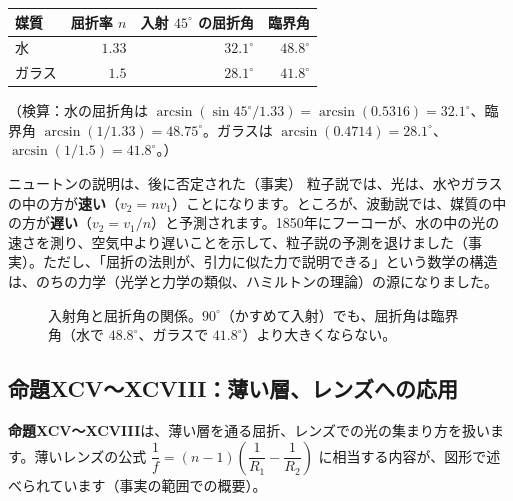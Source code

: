 \documentclass[a4paper,11pt,openany]{ltjsbook}
\begin{document}
\begin{center}
\begin{tabular}{lrrr}
\toprule
媒質 & 屈折率 $n$ & 入射 $45^\circ$ の屈折角 & 臨界角\\
\midrule
水 & $1.33$ & $32.1^\circ$ & $48.8^\circ$\\
ガラス & $1.5$ & $28.1^\circ$ & $41.8^\circ$\\
\bottomrule
\end{tabular}
\end{center}

（検算：水の屈折角は $\arcsin(\sin45^\circ/1.33)=\arcsin(0.5316)=32.1^\circ$、臨界角 $\arcsin(1/1.33)=48.75^\circ$。ガラスは $\arcsin(0.4714)=28.1^\circ$、$\arcsin(1/1.5)=41.8^\circ$。）

\begin{notebox}{ニュートンの説明は、後に否定された（事実）}
粒子説では、光は、水やガラスの中の方が\textbf{速い}（$v_2=nv_1$）ことになります。ところが、波動説では、媒質の中の方が\textbf{遅い}（$v_2=v_1/n$）と予測されます。1850年にフーコーが、水の中の光の速さを測り、空気中より遅いことを示して、粒子説の予測を退けました（事実）。ただし、「屈折の法則が、引力に似た力で説明できる」という数学の構造は、のちの力学（光学と力学の類似、ハミルトンの理論）の源になりました。
\end{notebox}

\begin{figure}[htbp]
\centering
{}
\caption{入射角と屈折角の関係。$90^\circ$（かすめて入射）でも、屈折角は臨界角（水で $48.8^\circ$、ガラスで $41.8^\circ$）より大きくならない。}
\end{figure}

\subsection{命題XCV〜XCVIII：薄い層、レンズへの応用}

\textbf{命題XCV〜XCVIII}は、薄い層を通る屈折、レンズでの光の集まり方を扱います。薄いレンズの公式 $\dfrac1f=(n-1)\left(\dfrac1{R_1}-\dfrac1{R_2}\right)$ に相当する内容が、図形で述べられています（事実の範囲での概要）。
\end{document}
